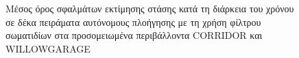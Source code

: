 \begin{frame}
  \footnotesize

  \begin{figure}[h]\centering\vspace{1cm}
     \begin{subfigure}{0.49\linewidth}\centering
       
     \end{subfigure}
     \begin{subfigure}{0.49\linewidth} \centering
       
     \end{subfigure}
     \vspace{0.75cm}
  \caption{Μέσος όρος σφαλμάτων εκτίμησης στάσης κατά τη διάρκεια του
           χρόνου σε δέκα πειράματα αυτόνομους πλοήγησης με τη χρήση φίλτρου
           σωματιδίων στα προσομειωμένα περιβάλλοντα CORRIDOR και WILLOWGARAGE}
  \end{figure}


\end{frame}
